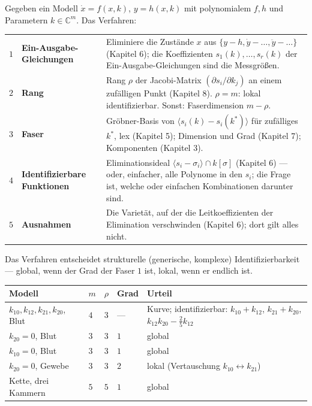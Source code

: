 \begin{merksatz}
Gegeben ein Modell $\dot x = f(x, k)$, $y = h(x, k)$ mit polynomialem $f, h$ und Parametern $k\in\mathbb C^{m}$. Das Verfahren:
\begin{center}
{\small
\renewcommand{\arraystretch}{1.5}
\begin{tabular}{@{}P{0.6cm}P{3.0cm}P{5.0cm}@{}}
\toprule
$1$ & \textbf{Ein-Ausgabe-Gleichungen} & Eliminiere die Zustände $x$ aus $\{y - h, \dot y - \ldots, \ddot y - \ldots\}$ (Kapitel 6); die Koeffizienten $s_1(k), \ldots, s_r(k)$ der Ein-Ausgabe-Gleichungen sind die Messgrößen.\\
$2$ & \textbf{Rang} & Rang $\rho$ der Jacobi-Matrix $(\partial s_i/\partial k_j)$ an einem zufälligen Punkt (Kapitel 8). $\rho = m$: lokal identifizierbar. Sonst: Faserdimension $m - \rho$.\\
$3$ & \textbf{Faser} & Gröbner-Basis von $\langle s_i(k) - s_i(k^{*})\rangle$ für zufälliges $k^{*}$, lex (Kapitel 5); Dimension und Grad (Kapitel 7); Komponenten (Kapitel 3).\\
$4$ & \textbf{Identifizierbare Funktionen} & Eliminationsideal $\langle s_i - \sigma_i\rangle\cap k[\sigma]$ (Kapitel 6) --- oder, einfacher, alle Polynome in den $s_i$; die Frage ist, welche  oder einfachen Kombinationen darunter sind.\\
$5$ & \textbf{Ausnahmen} & Die Varietät, auf der die Leitkoeffizienten der Elimination verschwinden (Kapitel 6); dort gilt alles nicht.\\
\bottomrule
\end{tabular}}
\end{center}
Das Verfahren entscheidet strukturelle (generische, komplexe) Identifizierbarkeit --- global, wenn der Grad der Faser $1$ ist, lokal, wenn er endlich ist.

\begin{center}
{\small
\renewcommand{\arraystretch}{1.5}
\begin{tabular}{@{}P{3.4cm}P{1.0cm}P{1.0cm}P{1.0cm}P{2.0cm}@{}}
\toprule
\textbf{Modell} & $m$ & $\rho$ & \textbf{Grad} & \textbf{Urteil}\\
\midrule
$k_{10}, k_{12}, k_{21}, k_{20}$, Blut & $4$ & $3$ & --- & Kurve; identifizierbar: $k_{10} + k_{12}$, $k_{21} + k_{20}$, $k_{12}k_{20} - \tfrac25k_{12}$\\
$k_{20} = 0$, Blut & $3$ & $3$ & $1$ & global\\
$k_{10} = 0$, Blut & $3$ & $3$ & $1$ & global\\
$k_{20} = 0$, Gewebe & $3$ & $3$ & $2$ & lokal (Vertauschung $k_{10}\leftrightarrow k_{21}$)\\
Kette, drei Kammern & $5$ & $5$ & $1$ & global\\
\bottomrule
\end{tabular}}
\end{center}


\end{merksatz}
